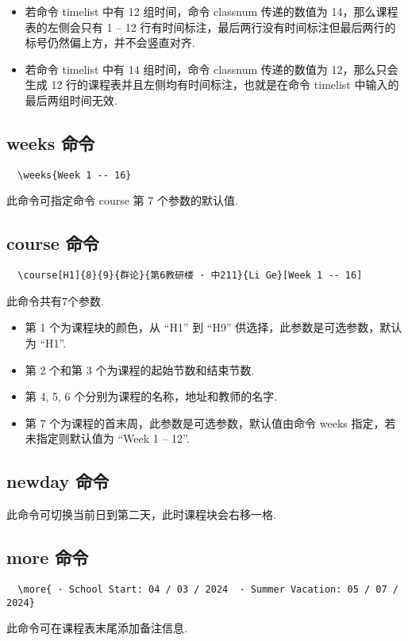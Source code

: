 \documentclass[11pt]{article}
\def\cmd#1{\texorpdfstring{\textcolor{cmdcolor}{\textsf{#1}}}{“#1”}}
\begin{document}
\begin{itemize}
  \item 若命令 \cmd{timelist} 中有 12 组时间，命令 \cmd{classnum} 传递的数值为 14，那么课程表的左侧会只有 1 -- 12 行有时间标注，最后两行没有时间标注但最后两行的标号仍然偏上方，并不会竖直对齐.
  \item 若命令 \cmd{timelist} 中有 14 组时间，命令 \cmd{classnum} 传递的数值为 12，那么只会生成 12 行的课程表并且左侧均有时间标注，也就是在命令 \cmd{timelist} 中输入的最后两组时间无效.
\end{itemize}

\subsection{\cmd{weeks} 命令}
\begin{verbatim}
  \weeks{Week 1 -- 16}
\end{verbatim}

此命令可指定命令 \cmd{course} 第 7 个参数的默认值.

\subsection{\cmd{course} 命令}
\begin{verbatim}
  \course[H1]{8}{9}{群论}{第6教研楼 · 中211}{Li Ge}[Week 1 -- 16]
\end{verbatim}

此命令共有7个参数.
\begin{itemize}
  \item 第 1 个为课程块的颜色，从 ``H1'' 到 ``H9'' 供选择，此参数是可选参数，默认为 ``H1''.
  \item 第 2 个和第 3 个为课程的起始节数和结束节数.
  \item 第 4, 5, 6 个分别为课程的名称，地址和教师的名字.
  \item 第 7 个为课程的首末周，此参数是可选参数，默认值由命令 \cmd{weeks} 指定，若未指定则默认值为 ``Week 1 -- 12''.
\end{itemize}



\subsection{\cmd{newday} 命令}
此命令可切换当前日到第二天，此时课程块会右移一格.

\subsection{\cmd{more} 命令}
\begin{verbatim}
  \more{ · School Start: 04 / 03 / 2024  · Summer Vacation: 05 / 07 / 2024}
\end{verbatim}
此命令可在课程表末尾添加备注信息.
\end{document}
